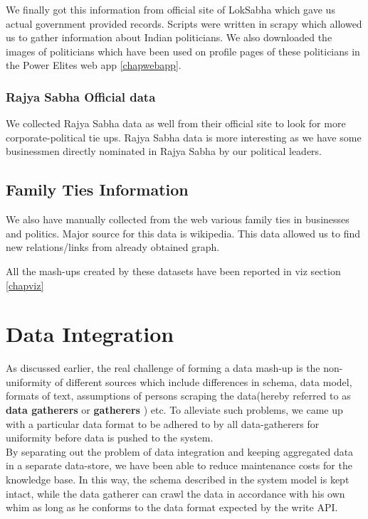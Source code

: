 We finally got this information from official site of LokSabha which gave us actual government provided records. Scripts were written in scrapy which allowed us to gather information about Indian politicians. We also downloaded the images of politicians which have been used on profile pages of these politicians in the Power Elites web app \ref{chapwebapp}.

\subsubsection{Rajya Sabha Official data}

We collected Rajya Sabha data as well from their official site to look for more corporate-political tie ups. Rajya Sabha data is more interesting as we have some businessmen directly nominated in Rajya Sabha by our political leaders.  

\subsection{Family Ties Information}

We also have manually collected from the web various family ties in businesses and politics. Major source for this data is wikipedia. This data allowed us to find new relations/links from already obtained graph.\cite{indianbfamilies} \cite{indianpfamilies}


All the mash-ups created by these datasets have been reported in viz section \ref{chapviz}

\section{Data Integration}
\label{dataint}

As discussed earlier, the real challenge of forming a data mash-up is the non-uniformity of different sources which include differences in schema, data model, formats of text, assumptions of persons scraping the data(hereby referred to as \textbf{ data gatherers } or \textbf{ gatherers }) etc. To alleviate such problems, we came up with a particular data format to be adhered to by all data-gatherers for uniformity before data is pushed to the system.\\

By separating out the problem of data integration and keeping aggregated data in a separate data-store, we have been able to reduce maintenance costs for the knowledge base. In this way, the schema described in the system model is kept intact, while the data gatherer can crawl the data in accordance with his own whim as long as he conforms to the data format expected by the write API. \\


